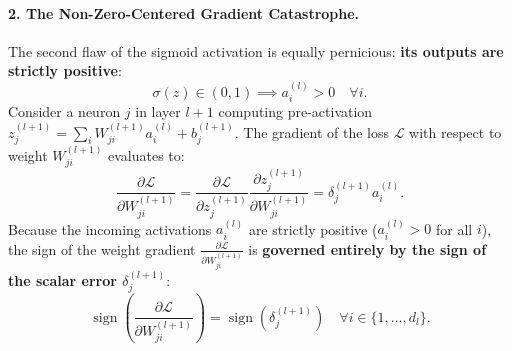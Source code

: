 \paragraph{2. The Non-Zero-Centered Gradient Catastrophe.}
The second flaw of the sigmoid activation is equally pernicious: \textbf{its outputs are strictly positive}:
\begin{equation}
\sigma(z) \in (0, 1) \implies a_i^{(l)} > 0 \quad \forall i.
\label{eq:strictly_positive_sigmoid}
\end{equation}
Consider a neuron $j$ in layer $l+1$ computing pre-activation $z_j^{(l+1)} = \sum_{i} W_{ji}^{(l+1)} a_i^{(l)} + b_j^{(l+1)}$. The gradient of the loss $\mathcal{L}$ with respect to weight $W_{ji}^{(l+1)}$ evaluates to:
\begin{equation}
\frac{\partial \mathcal{L}}{\partial W_{ji}^{(l+1)}} = \frac{\partial \mathcal{L}}{\partial z_j^{(l+1)}} \frac{\partial z_j^{(l+1)}}{\partial W_{ji}^{(l+1)}} = \delta_j^{(l+1)} a_i^{(l)}.
\label{eq:weight_grad_sign}
\end{equation}
Because the incoming activations $a_i^{(l)}$ are strictly positive ($a_i^{(l)} > 0$ for all $i$), the sign of the weight gradient $\frac{\partial \mathcal{L}}{\partial W_{ji}^{(l+1)}}$ is \textbf{governed entirely by the sign of the scalar error $\delta_j^{(l+1)}$}:
\begin{equation}
\operatorname{sign}\left( \frac{\partial \mathcal{L}}{\partial W_{ji}^{(l+1)}} \right) = \operatorname{sign}\left( \delta_j^{(l+1)} \right) \quad \forall i \in \{1, \dots, d_l\}.
\label{eq:uniform_sign_constraint}
\end{equation}

